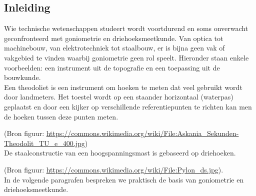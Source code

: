 \subsection*{Inleiding}

Wie technische wetenschappen studeert wordt voortdurend en soms onverwacht geconfronteerd met goniometrie en driehoeksmeetkunde. Van optica tot machinebouw, van elektrotechniek tot staalbouw, er is bijna geen vak of vakgebied te vinden waarbij goniometrie geen rol speelt. Hieronder staan enkele voorbeelden: een instrument uit de topografie en een toepassing uit de bouwkunde.\\

Een theodoliet is een instrument om hoeken te meten dat veel gebruikt wordt door landmeters. Het toestel wordt op een staander horizontaal (waterpas) geplaatst en door een kijker op verschillende referentiepunten te richten kan men de hoeken tussen deze punten meten.



(Bron figuur: \url{https://commons.wikimedia.org/wiki/File:Askania_Sekunden-Theodolit_TU_e_400.jpg})\\

De staalconstructie van een hoogspanningsmast is gebaseerd op driehoeken.



(Bron figuur: \url{https://commons.wikimedia.org/wiki/File:Pylon_ds.jpg}).\\

In de volgende paragrafen bespreken we praktisch de basis van goniometrie en driehoeksmeetkunde.\\

